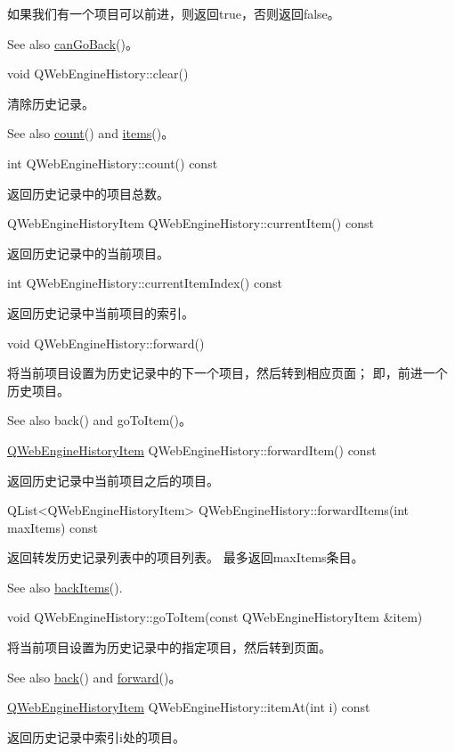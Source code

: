 如果我们有一个项目可以前进，则返回true，否则返回false。

See also \href{https://doc.qt.io/qt-5/qwebenginehistory.html#canGoBack}{canGoBack}()。

void QWebEngineHistory::clear()

清除历史记录。

See also \href{https://doc.qt.io/qt-5/qwebenginehistory.html#count}{count}() and \href{https://doc.qt.io/qt-5/qwebenginehistory.html#items}{items}()。

int QWebEngineHistory::count() const

返回历史记录中的项目总数。

QWebEngineHistoryItem QWebEngineHistory::currentItem() const

返回历史记录中的当前项目。

int QWebEngineHistory::currentItemIndex() const

返回历史记录中当前项目的索引。

void QWebEngineHistory::forward()

将当前项目设置为历史记录中的下一个项目，然后转到相应页面； 即，前进一个历史项目。

See also back() and goToItem()。

\href{https://github.com/QtDocumentCN/QtDocumentCN/blob/master/Src/W/QWebEngineHistoryItem/QWebEngineHistoryItem.md}{QWebEngineHistoryItem} QWebEngineHistory::forwardItem() const

返回历史记录中当前项目之后的项目。

QList<QWebEngineHistoryItem> QWebEngineHistory::forwardItems(int maxItems) const

返回转发历史记录列表中的项目列表。 最多返回maxItems条目。

See also \href{https://doc.qt.io/qt-5/qwebenginehistory.html#backItems}{backItems}().

void QWebEngineHistory::goToItem(const QWebEngineHistoryItem \&item)

将当前项目设置为历史记录中的指定项目，然后转到页面。

See also \href{https://doc.qt.io/qt-5/qwebenginehistory.html#back}{back}() and \href{https://doc.qt.io/qt-5/qwebenginehistory.html#forward}{forward}()。

\href{https://github.com/QtDocumentCN/QtDocumentCN/blob/master/Src/W/QWebEngineHistoryItem/QWebEngineHistoryItem.md}{QWebEngineHistoryItem} QWebEngineHistory::itemAt(int i) const

返回历史记录中索引i处的项目。

